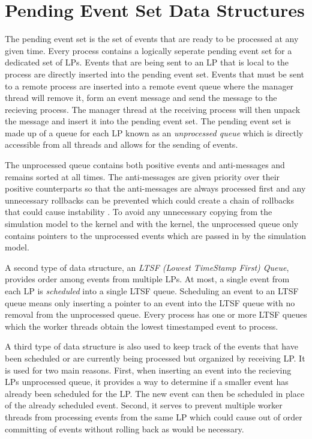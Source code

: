 \documentclass[11pt]{book}
\begin{document}
\section{Pending Event Set Data Structures}

The pending event set is the set of events that are ready to be processed at any given time.
Every process contains a logically seperate pending event set for a dedicated set of LPs. Events
that are being sent to an LP that is local to the process are directly inserted into the pending
event set. Events that must be sent to a remote process are inserted into a remote event
queue where the manager thread will remove it, form an event message and send the message to
the recieving process. The manager thread at the receiving process will then unpack the message
and insert it into the pending event set. The pending event set is made up of a queue for each
LP known as an \emph{unprocessed queue} which is directly accessible from all threads and allows
for the sending of events.

The unprocessed queue contains both positive events and anti-messages and remains sorted at all
times. The anti-messages are given priority over their positive counterparts so that the
anti-messages are always processed first and any unnecessary rollbacks can be prevented which
could create a chain of rollbacks that could cause instability \cite{lubachevsky-89}. To avoid
any unnecessary copying from the simulation model to the kernel and with the kernel, the
unprocessed queue only contains pointers to the unprocessed events which are passed in by the
simulation model.

A second type of data structure, an \emph{LTSF (Lowest TimeStamp First) Queue}, provides
order among events from multiple LPs. At most, a single event from each LP is \emph{scheduled}
into a single LTSF queue. Scheduling an event to an LTSF queue means only inserting a pointer
to an event into the LTSF queue with no removal from the unprocessed queue. Every process has
one or more LTSF queues which the worker threads obtain the lowest timestamped event to process.

A third type of data structure is also used to keep track of the events that have been
scheduled or are currently being processed but organized by receiving LP. It is used for
two main reasons. First, when inserting an event into the recieving LPs unprocessed queue, it
provides a way to determine if a smaller event has already been scheduled for the LP. The new
event can then be scheduled in place of the already scheduled event. Second, it serves to
prevent multiple worker threads from processing events from the same LP which could cause
out of order committing of events without rolling back as would be necessary.
\end{document}
